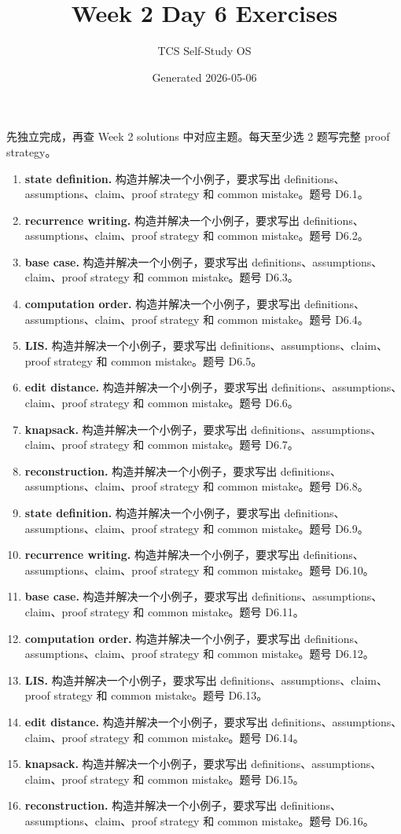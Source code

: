 \documentclass[11pt]{ctexart}
\title{Week 2 Day 6 Exercises}
\author{TCS Self-Study OS}
\date{Generated 2026-05-06}
\begin{document}
\maketitle
先独立完成，再查 Week 2 solutions 中对应主题。每天至少选 2 题写完整 proof strategy。
\begin{enumerate}
  \item \textbf{state definition.} 构造并解决一个小例子，要求写出 definitions、assumptions、claim、proof strategy 和 common mistake。题号 D6.1。
  \item \textbf{recurrence writing.} 构造并解决一个小例子，要求写出 definitions、assumptions、claim、proof strategy 和 common mistake。题号 D6.2。
  \item \textbf{base case.} 构造并解决一个小例子，要求写出 definitions、assumptions、claim、proof strategy 和 common mistake。题号 D6.3。
  \item \textbf{computation order.} 构造并解决一个小例子，要求写出 definitions、assumptions、claim、proof strategy 和 common mistake。题号 D6.4。
  \item \textbf{LIS.} 构造并解决一个小例子，要求写出 definitions、assumptions、claim、proof strategy 和 common mistake。题号 D6.5。
  \item \textbf{edit distance.} 构造并解决一个小例子，要求写出 definitions、assumptions、claim、proof strategy 和 common mistake。题号 D6.6。
  \item \textbf{knapsack.} 构造并解决一个小例子，要求写出 definitions、assumptions、claim、proof strategy 和 common mistake。题号 D6.7。
  \item \textbf{reconstruction.} 构造并解决一个小例子，要求写出 definitions、assumptions、claim、proof strategy 和 common mistake。题号 D6.8。
  \item \textbf{state definition.} 构造并解决一个小例子，要求写出 definitions、assumptions、claim、proof strategy 和 common mistake。题号 D6.9。
  \item \textbf{recurrence writing.} 构造并解决一个小例子，要求写出 definitions、assumptions、claim、proof strategy 和 common mistake。题号 D6.10。
  \item \textbf{base case.} 构造并解决一个小例子，要求写出 definitions、assumptions、claim、proof strategy 和 common mistake。题号 D6.11。
  \item \textbf{computation order.} 构造并解决一个小例子，要求写出 definitions、assumptions、claim、proof strategy 和 common mistake。题号 D6.12。
  \item \textbf{LIS.} 构造并解决一个小例子，要求写出 definitions、assumptions、claim、proof strategy 和 common mistake。题号 D6.13。
  \item \textbf{edit distance.} 构造并解决一个小例子，要求写出 definitions、assumptions、claim、proof strategy 和 common mistake。题号 D6.14。
  \item \textbf{knapsack.} 构造并解决一个小例子，要求写出 definitions、assumptions、claim、proof strategy 和 common mistake。题号 D6.15。
  \item \textbf{reconstruction.} 构造并解决一个小例子，要求写出 definitions、assumptions、claim、proof strategy 和 common mistake。题号 D6.16。
\end{enumerate}
\end{document}
